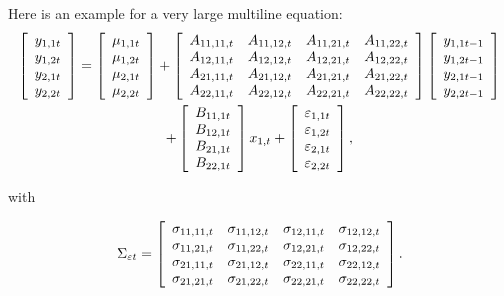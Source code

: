 \documentclass[Theme1]{{template_material/eurostat}}
\begin{document}
Here is an example for a very large multiline equation:
\begin{multline}
\left[
\begin{array}
[c]{c}%
y_{1,1t}\\
y_{1,2t}\\
y_{2,1t}\\
y_{2,2t}%
\end{array}
\right]  =\left[
\begin{array}
[c]{c}%
\mu_{1,1t}\\
\mu_{1,2t}\\
\mu_{2,1t}\\
\mu_{2,2t}%
\end{array}
\right]  +\left[
\begin{array}
[c]{cccc}%
A_{11,11,t} & A_{11,12,t} & A_{11,21,t} & A_{11,22,t}\\
A_{12,11,t} & A_{12,12,t} & A_{12,21,t} & A_{12,22,t}\\
A_{21,11,t} & A_{21,12,t} & A_{21,21,t} & A_{21,22,t}\\
A_{22,11,t} & A_{22,12,t} & A_{22,21,t} & A_{22,22,t}%
\end{array}
\right]  \left[
\begin{array}
[c]{c}%
y_{1,1t-1}\\
y_{1,2t-1}\\
y_{2,1t-1}\\
y_{2,2t-1}%
\end{array}
\right] \\
+ \left[
\begin{array}
[c]{c}%
B_{11,1t}\\
B_{12,1t}\\
B_{21,1t}\\
B_{22,1t}%
\end{array}
\right]  x_{1,t}+\left[
\begin{array}
[c]{c}%
\varepsilon_{1,1t}\\
\varepsilon_{1,2t}\\
\varepsilon_{2,1t}\\
\varepsilon_{2,2t}%
\end{array}
\right]  , \label{example2}%
\end{multline}


with%

\[
\Sigma_{\varepsilon t}=\left[
\begin{array}
[c]{cccc}%
\sigma_{11,11,t} & \sigma_{11,12,t} & \sigma_{12,11,t} & \sigma_{12,12,t}\\
\sigma_{11,21,t} & \sigma_{11,22,t} & \sigma_{12,21,t} & \sigma_{12,22,t}\\
\sigma_{21,11,t} & \sigma_{21,12,t} & \sigma_{22,11,t} & \sigma_{22,12,t}\\
\sigma_{21,21,t} & \sigma_{21,22,t} & \sigma_{22,21,t} & \sigma_{22,22,t}%
\end{array}
\right]  .
\]
\end{document}
